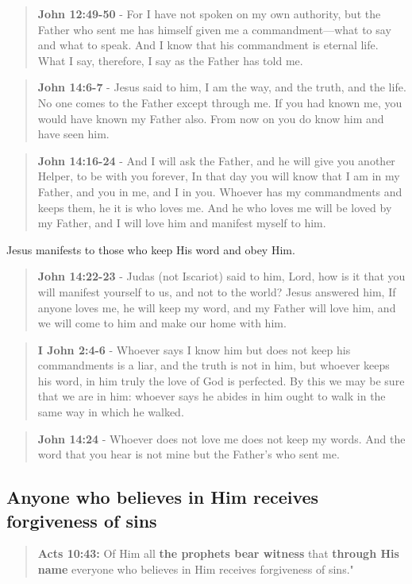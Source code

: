 \documentclass[11pt]{article}
\begin{document}
\begin{quote}
\textbf{John 12:49-50} - For I have not spoken on my own authority, but the Father who sent me has himself given me a commandment—what to say and what to speak. And I know that his commandment is eternal life. What I say, therefore, I say as the Father has told me.
\end{quote}

\begin{quote}
\textbf{John 14:6-7} - Jesus said to him, I am the way, and the truth, and the life. No one comes to the Father except through me. If you had known me, you would have known my Father also. From now on you do know him and have seen him.
\end{quote}

\begin{quote}
\textbf{John 14:16-24} - And I will ask the Father, and he will give you another Helper, to be with you forever, In that day you will know that I am in my Father, and you in me, and I in you. Whoever has my commandments and keeps them, he it is who loves me. And he who loves me will be loved by my Father, and I will love him and manifest myself to him.
\end{quote}

Jesus manifests to those who keep His word and obey Him.

\begin{quote}
\textbf{John 14:22-23} - Judas (not Iscariot) said to him, Lord, how is it that you will manifest yourself to us, and not to the world? Jesus answered him, If anyone loves me, he will keep my word, and my Father will love him, and we will come to him and make our home with him.
\end{quote}

\begin{quote}
\textbf{I John 2:4-6} - Whoever says I know him but does not keep his commandments is a liar, and the truth is not in him, but whoever keeps his word, in him truly the love of God is perfected. By this we may be sure that we are in him: whoever says he abides in him ought to walk in the same way in which he walked.
\end{quote}

\begin{quote}
\textbf{John 14:24} - Whoever does not love me does not keep my words. And the word that you hear is not mine but the Father's who sent me.
\end{quote}

\subsection{Anyone who believes in Him receives forgiveness of sins}
\label{sec:orgc844990}
\begin{quote}
\textbf{Acts 10:43:} Of Him all \textbf{the prophets bear witness} that \textbf{through His name} everyone who believes in Him receives forgiveness of sins."
\end{quote}
\end{document}
